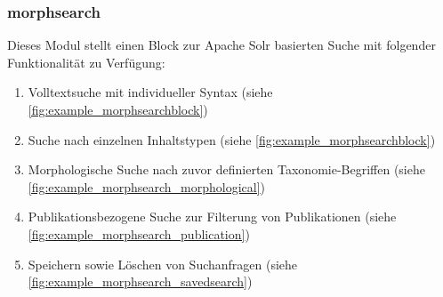 \newpage
\subsubsection{morphsearch}\label{subsub:morphsearch}
Dieses Modul stellt einen Block zur Apache Solr basierten Suche mit folgender Funktionalität zu Verfügung:
\begin{enumerate}
	\item Volltextsuche mit individueller Syntax (siehe \cref{fig:example_morphsearchblock})
	\item Suche nach einzelnen Inhaltstypen (siehe \cref{fig:example_morphsearchblock})
	\item Morphologische Suche nach zuvor definierten Taxonomie-Begriffen (siehe \cref{fig:example_morphsearch_morphological})
	\item Publikationsbezogene Suche zur Filterung von Publikationen (siehe \cref{fig:example_morphsearch_publication})
	\item Speichern sowie Löschen von Suchanfragen  (siehe \cref{fig:example_morphsearch_savedsearch})
\end{enumerate}

